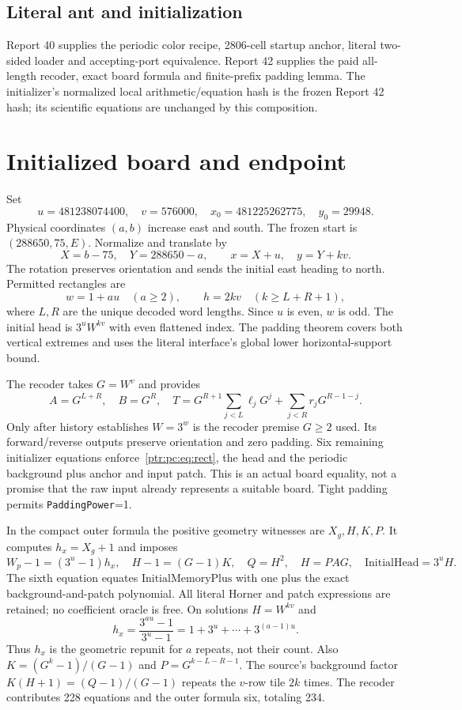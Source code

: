 \documentclass[11pt,letterpaper]{article}
\theoremstyle{definition}\newtheorem{definition}[theorem]{Definition}
\theoremstyle{remark}\newtheorem{remark}[theorem]{Remark}
\newcommand{\codeu}[1]{\nolinkurl{#1}}
\newcommand{\IM}{\mathrm{InitialMemoryPlus}}\newcommand{\IH}{\mathrm{InitialHead}}
\begin{document}
\subsection{Literal ant and initialization}
Report 40 supplies the periodic color recipe, 2806-cell startup anchor, literal two-sided loader and accepting-port equivalence. Report 42 supplies the paid all-length recoder, exact board formula and finite-prefix padding lemma. The initializer's normalized local arithmetic/equation hash is the frozen Report 42 hash; its scientific equations are unchanged by this composition.

\section{Initialized board and endpoint}\label{ptr:pc:sec:splice}
Set
\[
 u=481238074400,\quad v=576000,\quad
 x_0=481225262775,\quad y_0=29948.
\]
Physical coordinates $(a,b)$ increase east and south. The frozen start is $(288650,75,E)$. Normalize and translate by
\begin{equation}\label{ptr:pc:eq:rotation}
 X=b-75,\quad Y=288650-a,\qquad x=X+u,\quad y=Y+kv.
\end{equation}
The rotation preserves orientation and sends the initial east heading to north. Permitted rectangles are
\begin{equation}\label{ptr:pc:eq:rect}
 w=1+au\quad(a\ge2),\qquad h=2kv\quad(k\ge L+R+1),
\end{equation}
where $L,R$ are the unique decoded word lengths. Since $u$ is even, $w$ is odd. The initial head is $3^uW^{kv}$ with even flattened index. The padding theorem covers both vertical extremes and uses the literal interface's global lower horizontal-support bound.

The recoder takes $G=W^v$ and provides
\begin{equation}\label{ptr:pc:eq:recoder}
 A=G^{L+R},\quad B=G^R,\quad
 T=G^{R+1}\sum_{j<L}\ell_jG^j+\sum_{j<R}r_jG^{R-1-j}.
\end{equation}
Only after history establishes $W=3^w$ is the recoder premise $G\ge2$ used. Its forward/reverse outputs preserve orientation and zero padding. Six remaining initializer equations enforce~\eqref{ptr:pc:eq:rect}, the head and the periodic background plus anchor and input patch. This is an actual board equality, not a promise that the raw input already represents a suitable board. Tight padding permits \codeu{PaddingPower}=1.

In the compact outer formula the positive geometry witnesses are $X_g,H,K,P$. It computes $h_x=X_g+1$ and imposes
\[
 W_p-1=(3^u-1)h_x,\quad H-1=(G-1)K,\quad Q=H^2,
 \quad H=PAG,\quad \IH=3^uH.
\]
The sixth equation equates $\IM$ with one plus the exact background-and-patch polynomial. All literal Horner and patch expressions are retained; no coefficient oracle is free. On solutions $H=W^{kv}$ and
\[
 h_x=\frac{3^{au}-1}{3^u-1}=1+3^u+\cdots+3^{(a-1)u}.
\]
Thus $h_x$ is the geometric repunit for $a$ repeats, not their count. Also $K=(G^k-1)/(G-1)$ and $P=G^{k-L-R-1}$. The source's background factor $K(H+1)=(Q-1)/(G-1)$ repeats the $v$-row tile $2k$ times. The recoder contributes 228 equations and the outer formula six, totaling 234.
\end{document}
